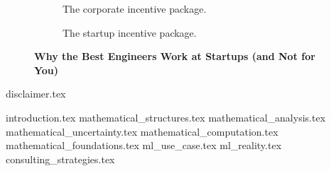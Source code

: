 \documentclass{article}
\begin{document}
\begin{titlepage}
\begin{figure}[H]
      \begin{subfigure}[t]{0.45\textwidth}
      \centering
      \caption*{The corporate incentive package.}
      \end{subfigure}
      \hfill
      \begin{subfigure}[t]{0.45\textwidth}
      \centering
      \caption*{The startup incentive package.}
      \end{subfigure}
      
      \caption*{\textbf{Why the Best Engineers Work at Startups (and Not for You)}}
    \end{figure}
      
  
  \end{titlepage}

  {disclaimer.tex}
  


  \tableofcontents

  \newpage


  {introduction.tex}
  {mathematical_structures.tex}
  {mathematical_analysis.tex}
  {mathematical_uncertainty.tex}
  {mathematical_computation.tex}
  {mathematical_foundations.tex}
  {ml_use_case.tex}
  {ml_reality.tex}
  {consulting_strategies.tex}
\end{document}
